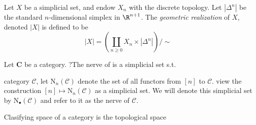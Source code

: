 \begin{definition}[Realization]
    Let \(X\) be a simplicial set, and endow \(X_n\) with the discrete topology.
    Let \(|\Delta^n|\) be the standard \(n\)-dimensional simplex in \(\R^{n+1}\).
    The \textit{geometric realization} of \(X\), denoted \(|X|\) is defined to be 
    \[|X| = \left( \coprod_{n\geq 0}  X_n \times  |\Delta^n| \right)/ \sim\]

\end{definition}





\begin{definition}
    Let \(\mathbf{C}\) be a category. ?The nerve of is a simplicial set s.t.

    category \(\mathcal{C}\),  let \(\mathrm{N}_n(\mathcal{C})\) denote the set of all functors from \([n]\) to \(\mathcal{C}\). view the construction \([n] \mapsto \mathrm{N}_n(\mathcal{C})\) as a simplicial set. We will denote this simplicial set by \(\mathrm{N}_{\bullet}(\mathcal{C})\) and refer to it as the nerve of \(\mathcal{C}\).
\end{definition}



Clasifying space of a category is the topological space











